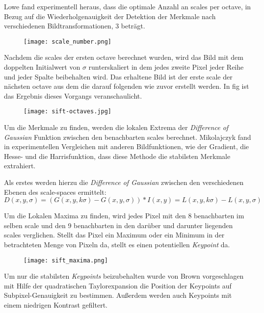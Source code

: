 Lowe fand experimentell heraus, dass die optimale Anzahl an \Glspl{scale} per \Gls{octave}, in Bezug auf die Wiederholgenauigkeit der Detektion der Merkmale nach verschiedenen Bildtransformationen, 3 beträgt.
\begin{figure}[h]
\texttt{[image: scale\_number.png]}
\centering
\end{figure}
Nachdem die \Glspl{scale} der ersten \Gls{octave} berechnet wurden, wird das Bild mit dem doppelten Initialwert von $ \sigma $ runterskaliert in dem jedes zweite Pixel jeder Reihe und jeder Spalte beibehalten wird. Das erhaltene Bild ist der erste \Gls{scale} der nächsten \Gls{octave} aus dem die darauf folgenden wie zuvor erstellt werden.
In fig ist das Ergebnis dieses Vorgangs veranschaulicht.

\begin{figure}[h]
\texttt{[image: sift-octaves.jpg]}
\centering
\end{figure}

Um die Merkmale zu finden, werden die lokalen Extrema der \emph{Difference of Gaussian} Funktion zwischen den benachbarten \Glspl{scale} berechnet. Mikolajczyk fand in experimentellen Vergleichen mit anderen Bildfunktionen, wie der Gradient, die Hesse- und die Harrisfunktion, dass diese Methode die stabilsten Merkmale extrahiert.

Als erstes werden hierzu die \emph{Difference of Gaussian} zwischen den verschiedenen Ebenen des \Gls{scale-space}s ermittelt:	
\begin{equation}
D(x, y, \sigma) = (G(x, y, k\sigma) - G(x, y, \sigma)) \ast I(x, y)
= L(x, y, k\sigma) - L(x, y, \sigma)
\end{equation} 

Um die Lokalen Maxima zu finden, wird jedes Pixel mit den 8 benachbarten im selben \Gls{scale} und den 9 benachbarten in den darüber und darunter liegenden \Glspl{scale} verglichen. Stellt das Pixel ein Maximum oder ein Minimum in der betrachteten Menge von Pixeln da, stellt es einen potentiellen \emph{Keypoint} da.

\begin{figure}[h]
\texttt{[image: sift\_maxima.png]}
\centering
\end{figure}

Um nur die stabilsten \emph{Keypoints} beizubehalten wurde von Brown vorgeschlagen mit Hilfe der quadratischen Taylorexpansion die Position der Keypoints auf Subpixel-Genauigkeit zu bestimmen.
Außerdem werden auch Keypoints mit einem niedrigen Kontrast gefiltert.

